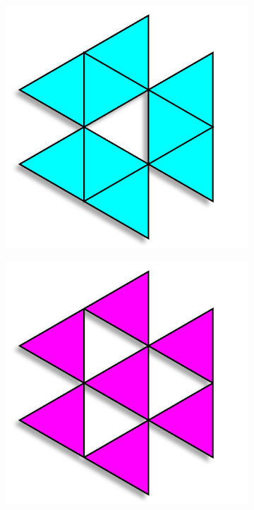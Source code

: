 \documentclass{article}
\begin{document}
\begin{figure}[H]
\begin{subfigure}[b]{0.1\textwidth}
    \end{subfigure}
    \begin{subfigure}[b]{0.1\textwidth}
        \centering
        \includegraphics[width=.9\textwidth]{graphics/behavior/center-columns/cyan.png}
    \end{subfigure}
    \begin{subfigure}[b]{0.1\textwidth}
        \centering
        \includegraphics[width=.9\textwidth]{graphics/behavior/center-columns/pink.png}

\end{subfigure}
\end{figure}
\end{document}
